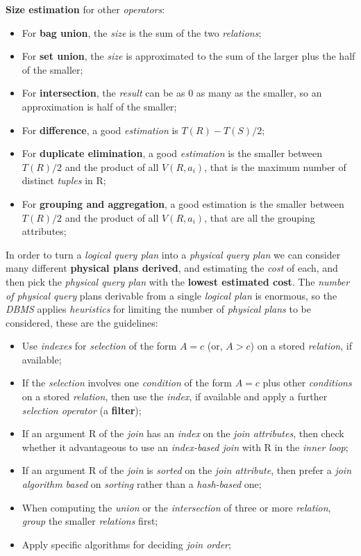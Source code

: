\documentclass{article}
\begin{document}
\textbf{Size estimation} for other \emph{operators}:
\begin{itemize}
\item For \textbf{bag union}, the \emph{size} is the sum of the two \emph{relations};
\item For \textbf{set union}, the \emph{size} is approximated to the sum of the larger plus the half of the smaller;
\item For \textbf{intersection}, the \emph{result} can be as 0 as many as the smaller, so an approximation is half of the smaller;
\item For \textbf{difference}, a good \emph{estimation} is $T(R) - T(S)/2$;
\item For \textbf{duplicate elimination}, a good \emph{estimation} is the smaller between $T(R)/2$ and the product of all $V(R,a_i)$, that is the maximum number of distinct \emph{tuples} in R;
\item For \textbf{grouping and aggregation}, a good estimation is the smaller between $T(R)/2$ and the product of all $V(R,a_i)$, that are all the grouping attributes;
\end{itemize}
In order to turn a \emph{logical query plan} into a \emph{physical query plan} we can consider many different \textbf{physical plans derived}, and estimating the \emph{cost} of each, and then pick the \emph{physical query plan} with the \textbf{lowest estimated cost}. The \emph{number of physical query} plans derivable from a single \emph{logical plan} is enormous, so the \emph{DBMS} applies \emph{heuristics} for limiting the number of \emph{physical plans }to be considered, these are the guidelines:
\begin{itemize}
\item Use \emph{indexes} for \emph{selection} of the form $A= c$ (or, $A >c$) on a stored \emph{relation}, if available;
\item If the \emph{selection} involves one \emph{condition} of the form $A= c$ plus other \emph{conditions} on a stored \emph{relation}, then use the \emph{index}, if available and apply a further \emph{selection operator} (a \textbf{filter});
\item If an argument R of the \emph{join} has an \emph{index} on the \emph{join attributes}, then check whether it advantageous to use an \emph{index-based join }with R in the \emph{inner loop};
\item If an argument R of the \emph{join} is \emph{sorted} on the \emph{join attribute}, then prefer a \emph{join algorithm based} on \emph{sorting} rather than a \emph{hash-based} one;
\item When computing the \emph{union} or the \emph{intersection} of three or more \emph{relation}, \emph{group} the smaller \emph{relations} first;
\item Apply specific algorithms for deciding\emph{ join order};
\end{itemize}
\end{document}
